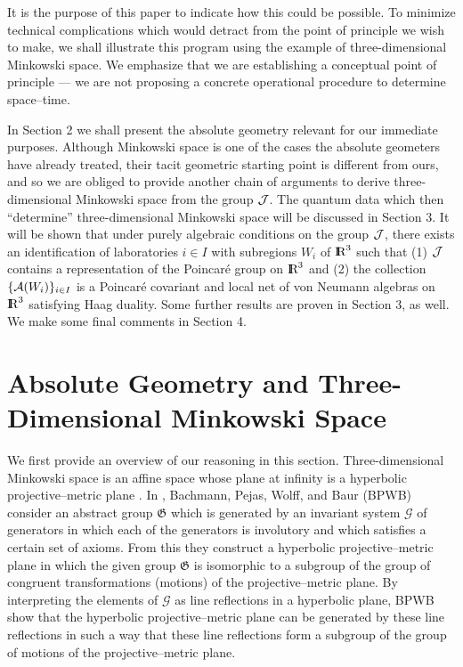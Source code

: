 \documentclass[a4paper,twoside,12pt]{article}
\def\As{{\cal A}}
\def\Js{{\cal J}}
\def\RR{\textnormal{{\rm I \hskip -5.75pt R}}}
\begin{document}
     It is the purpose of this paper to indicate how this could be
possible. To minimize technical complications which would detract from the
point of principle we wish to make, we shall illustrate this program
using the example of three-dimensional Minkowski space. We emphasize 
that we are establishing a conceptual point of principle --- we are
not proposing a concrete operational procedure to determine space--time.

     In Section 2 we shall present the absolute geometry relevant for
our immediate purposes. Although Minkowski space is one of the cases
the absolute geometers have already treated, their tacit geometric
starting point is different from ours, and so we are obliged to
provide another chain of arguments to derive three-dimensional
Minkowski space from the group $\Js$. The quantum data which then
``determine'' three-dimensional Minkowski space will be discussed in
Section 3. It will be shown that under purely algebraic conditions on
the group $\Js$, there exists an identification of laboratories $i \in
I$ with subregions $W_i$ of $\RR^3$ such that (1) $\Js$ contains a
representation of the Poincar\'e group on $\RR^3$ and (2) the
collection $\{\As(W_i)\}_{i\in I}$ is a Poincar\'e covariant and local
net of von Neumann algebras on $\RR^3$ satisfying Haag duality. Some
further results are proven in Section 3, as well. We make some final
comments in Section 4.


\section{Absolute Geometry and Three-Dimensional Minkowski Space}

     We first provide an overview of our reasoning in this section.
Three-dimensional Minkowski space is an affine space whose plane
at infinity is a hyperbolic projective--metric plane \cite{Cox1}. In
\cite{BBPW}, Bachmann, Pejas, Wolff, and Baur (BPWB) consider an abstract
group $\mathfrak{G}$ which is generated by an invariant system $\mathcal{G}$
of generators in which each of the generators is involutory and which
satisfies a certain set of axioms. From this they construct a hyperbolic
projective--metric plane in which the given group $\mathfrak{G}$ is
isomorphic to a subgroup of the group of congruent transformations
(motions) of the projective--metric plane. By interpreting the elements
of $\mathcal{G}$ as line reflections in a hyperbolic plane,
BPWB show that the hyperbolic projective--metric plane can be generated
by these line reflections in such a way that these line reflections
form a subgroup of the group of motions of the projective--metric plane.
\end{document}
